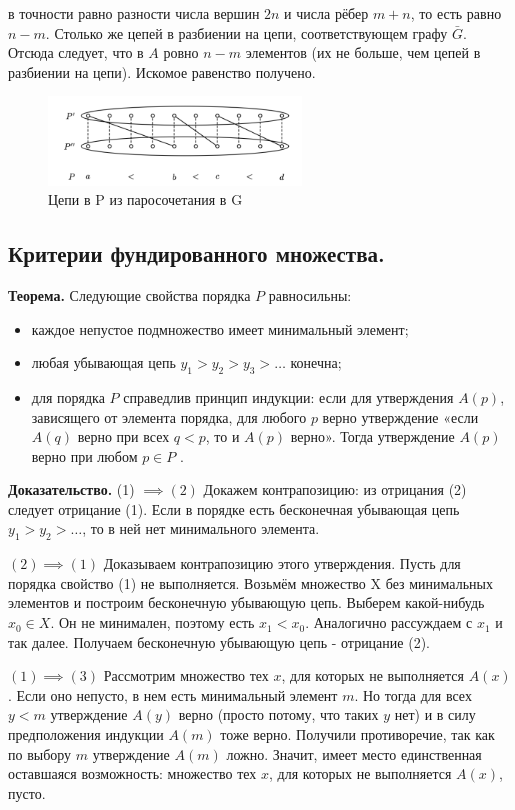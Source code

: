 \documentclass[a4paper, 10pt]{article}
\begin{document}
в точности равно разности числа вершин $2n$ и числа рёбер $m + n$, то есть равно $n - m$. Столько же цепей в разбиении на цепи, соответствующем графу $\bar G$.
Отсюда следует, что в $A$ ровно $n - m$ элементов (их не больше, чем цепей в разбиении на цепи). Искомое равенство получено.

\begin{figure}[h]
	\caption{Цепи в P из паросочетания в G}
	\centering
	\includegraphics[width=0.6\textwidth]{diluors}
\end{figure}


\subsection{Критерии фундированного множества.}

\textbf{Теорема.} Следующие свойства порядка $P$ равносильны:
\begin{itemize}
    \item каждое непустое подмножество имеет минимальный элемент;
    \item любая убывающая цепь $y_1 > y_2 > y_3 > \dots$ конечна;
    \item для порядка $P$ справедлив принцип индукции: если для утверждения $A(p)$, зависящего от элемента порядка, для любого $p$ верно утверждение «если $A(q)$ верно при всех $q < p$, то и $A(p)$ верно». Тогда утверждение $A(p)$ верно при любом $p \in P$ .
\end{itemize}

\textbf{Доказательство.} (1) $\implies (2)$ Докажем контрапозицию: из отрицания (2) следует отрицание (1). Если в порядке есть бесконечная убывающая цепь $y_1 > y_2 > \dots $, то в ней нет минимального элемента.

$(2) \implies (1)$ Доказываем контрапозицию этого утверждения. Пусть для порядка свойство (1) не выполняется. Возьмём множество X без минимальных элементов и построим бесконечную убывающую цепь. Выберем какой-нибудь $x_0 \in X.$ Он не минимален, поэтому есть $x_1 < x_0$. Аналогично рассуждаем с $x_1$ и так далее. Получаем бесконечную убывающую цепь - отрицание (2).

$(1) \implies (3)$ Рассмотрим множество тех $x$, для которых не выполняется $A(x)$. Если оно непусто, в нем есть минимальный элемент $m$. Но тогда для всех $y < m$ утверждение $A(y)$ верно (просто потому, что таких $y$ нет) и в силу предположения индукции $A(m)$ тоже верно. Получили противоречие, так как по выбору $m$ утверждение $A(m)$ ложно. Значит, имеет место единственная оставшаяся возможность: множество тех $x$, для которых не выполняется $A(x)$, пусто.
\end{document}
